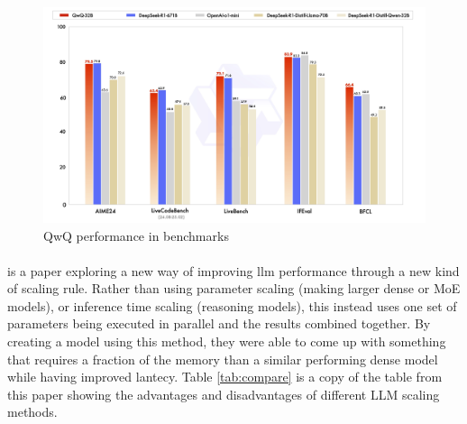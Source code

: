 \begin{figure}
    \centering
    \includegraphics[width=1\linewidth]{figure/qwq-32b-final.jpg}
    \caption{QwQ performance in benchmarks}
    \label{fig:qwq-performance}
\end{figure}

\paragraph{}\autocite{chen_parallel_2025} is a paper exploring a new way of improving \acrshort{llm} performance through a new kind of scaling rule. Rather than using parameter scaling (making larger dense or MoE models), or inference time scaling (reasoning models), this instead uses one set of parameters being executed in parallel and the results combined together. By creating a model using this method, they were able to come up with something that requires a fraction of the memory than a similar performing dense model while having improved lantecy. Table \ref{tab:compare} is a copy of the table from this paper showing the advantages and disadvantages of different LLM scaling methods.



{
\begin{table}[t]
\caption{Copy of comparison table from \textcite{chen_parallel_2025}}
\centering
{}
\label{tab:compare}
\end{table}
}

